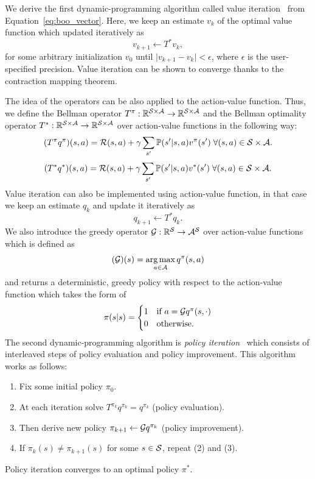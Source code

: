 We  derive the first dynamic-programming algorithm called value iteration~\citep{Bellman1958} from Equation~\ref{eq:boo_vector}. Here, we keep an estimate $v_k$ of the optimal value function which updated iteratively as 
\begin{equation}
  v_{k+1}\leftarrow T^* v_k,
  \label{eq:value_iteration}
\end{equation}
for some arbitrary initialization $v_0$ until $\lvert v_{k+1} - v_k\rvert < \epsilon$, where $\epsilon$ is the user-specified precision. Value iteration can be shown to converge thanks to the contraction mapping theorem. 

The idea of the operators can be also applied to the action-value function. Thus, we define the Bellman operator $T^\pi:\mathbb{R}^{\mathcal{S}\times\mathcal{A}}\rightarrow\mathbb{R}^{\mathcal{S}\times\mathcal{A}}$ and the Bellman optimality operator $T^*:\mathbb{R}^{\mathcal{S}\times\mathcal{A}}\rightarrow\mathbb{R}^{\mathcal{S}\times\mathcal{A}}$ over action-value functions in the following way:
\begin{equation}
(T^\pi q^\pi)(s, a) = \mathcal{R}(s, a) + \gamma \sum_{s'} \mathbb{P}(s'\lvert s, a)v^\pi(s')\;\forall (s, a)\in\mathcal{S}\times\mathcal{A}. 
\end{equation}
\begin{equation}
(T^* q^*)(s, a) = \mathcal{R}(s, a) + \gamma \sum_{s'} \mathbb{P}(s'\lvert s, a)v^*(s')\;\forall (s, a)\in\mathcal{S}\times\mathcal{A}.
\end{equation}
Value iteration can also be implemented using action-value function, in that case we keep an estimate $q_k$ and update it iteratively as
\begin{equation}
  q_{k+1}\leftarrow T^* q_k.
\end{equation}
We also introduce the greedy operator $\mathcal{G}:\mathbb{R}^{\mathcal{S}}\rightarrow\mathcal{A}^{\mathcal{S}}$ over action-value functions which is defined as 
\begin{equation}
  (\mathcal{G})(s) = \operatorname*{arg\,max}_{a\in\mathcal{A}} q^\pi(s, a) 
\end{equation}
and returns a deterministic, greedy policy with respect to the action-value function which takes the form of 
\begin{equation*}
 \pi(s\lvert s) =
    \begin{cases}
      1 & \text{if $a = \mathcal{G} q^\pi(s, \cdot)$}\\
      0 & \text{otherwise}.
    \end{cases}       
\end{equation*}
The second dynamic-programming algorithm is \textit{policy iteration}~\citep{Howard1960} which consists of interleaved steps of policy evaluation and policy improvement. This algorithm works as follows:
 \begin{enumerate}[label=(\arabic*)]
  \item Fix some initial policy $\pi_0$.
  \item At each iteration solve $T^{\pi_k} q^{\pi_k} = q^{\pi_k}$ (policy evaluation).
  \item Then derive new policy $\pi_{k+1}\leftarrow\mathcal{G} q^{\pi_k}$ (policy improvement).
  \item If $\pi_k(s)\neq\pi_{k+1}(s)$ for some $s\in\mathcal{S}$, repeat (2) and (3).
\end{enumerate}
Policy iteration converges to an optimal policy $\pi^*$.

